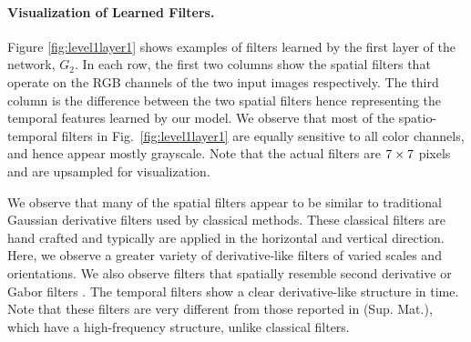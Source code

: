 \documentclass[10pt,twocolumn,letterpaper]{article}
\begin{document}
\paragraph{Visualization of Learned Filters.}
 Figure \ref{fig:level1layer1} shows examples of  filters learned by the first layer of the network, $G_2$. 
In each row, the first two columns show the spatial filters that operate on the RGB channels of the two input images respectively. 
The third column is the difference between the two spatial filters hence representing the temporal features learned by our model. 
We observe that most of the spatio-temporal filters in Fig.~\ref{fig:level1layer1} are equally sensitive to all color channels, and hence appear mostly grayscale.
Note that the actual filters are $7\times\/ 7$ pixels and are upsampled for visualization.
 
We observe that many of the spatial filters appear to be similar to traditional Gaussian derivative filters used by classical methods.
These classical filters are hand crafted and typically are applied in the horizontal and vertical direction.
Here, we observe a greater variety of derivative-like filters of varied scales and orientations.
We also observe filters that spatially resemble second derivative or Gabor filters \cite{adelson1985spatiotemporal}.
The temporal filters show a clear derivative-like structure in time.
Note that these filters are very different from those reported in \cite{dosovitskiy2015flownet} (Sup. Mat.), which have a high-frequency structure, unlike classical filters. 
\end{document}
